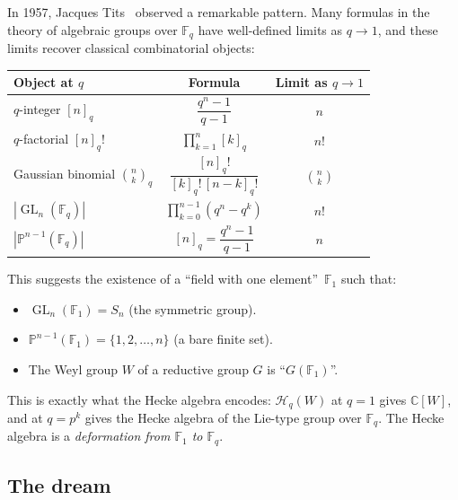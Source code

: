 \documentclass[11pt,a4paper]{article}
\theoremstyle{plain}
\theoremstyle{definition}
\newcommand{\C}{\mathbb{C}}
\newcommand{\F}{\mathbb{F}}
\newcommand{\GL}{\operatorname{GL}}
\begin{document}
\begin{tcolorbox}[breakable, colback=yellow!12, colframe=yellow!12,
  boxrule=0pt, sharp corners]
In 1957, Jacques Tits~\cite{Tits1957} observed a remarkable pattern.
Many formulas in the theory of algebraic groups over $\F_q$ have
well-defined limits as $q \to 1$, and these limits recover classical
combinatorial objects:

\medskip
\begin{center}
\renewcommand{\arraystretch}{1.4}
\begin{tabular}{lcc}
\toprule
Object at $q$ & Formula & Limit as $q \to 1$ \\
\midrule
$q$-integer $[n]_q$ & $\dfrac{q^n - 1}{q - 1}$ & $n$ \\[6pt]
$q$-factorial $[n]_q!$ & $\displaystyle\prod_{k=1}^n [k]_q$ & $n!$ \\[6pt]
Gaussian binomial $\displaystyle\binom{n}{k}_q$
  & $\dfrac{[n]_q!}{[k]_q!\,[n-k]_q!}$ & $\displaystyle\binom{n}{k}$ \\[6pt]
$|\GL_n(\F_q)|$ & $\displaystyle\prod_{k=0}^{n-1}(q^n - q^k)$ & $n!$ \\[6pt]
$|\mathbb{P}^{n-1}(\F_q)|$ & $[n]_q = \dfrac{q^n-1}{q-1}$ & $n$ \\
\bottomrule
\end{tabular}
\end{center}

\medskip
This suggests the existence of a ``field with one element''~$\F_1$
such that:
\begin{itemize}
\item $\GL_n(\F_1) = S_n$ (the symmetric group).
\item $\mathbb{P}^{n-1}(\F_1) = \{1, 2, \ldots, n\}$
  (a bare finite set).
\item The Weyl group $W$ of a reductive group $G$ is ``$G(\F_1)$''.
\end{itemize}

This is exactly what the Hecke algebra encodes: $\mathcal{H}_q(W)$ at
$q = 1$ gives $\C[W]$, and at $q = p^k$ gives the Hecke algebra of
the Lie-type group over $\F_q$. The Hecke algebra is a
\emph{deformation from $\F_1$ to $\F_q$}.
\end{tcolorbox}

\subsection{The dream}
\end{document}

